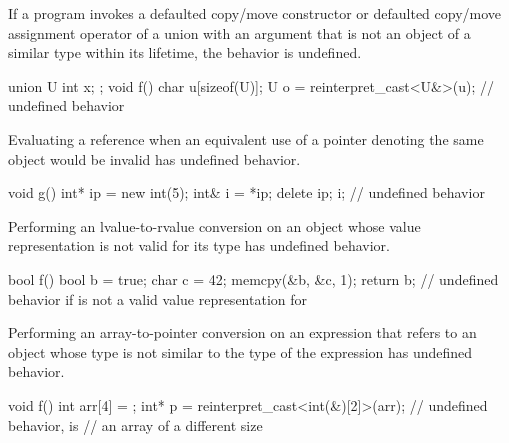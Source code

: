 \pnum
If a program invokes a defaulted copy/move constructor or
defaulted copy/move assignment operator of a union
with an argument that is not an object of a similar type
within its lifetime, the behavior is undefined.

\pnum
\begin{example}
\begin{codeblock}
union U { int x; };
void f()
{
   char u[sizeof(U)];
   U o = reinterpret_cast<U&>(u);   // undefined behavior
}
\end{codeblock}
\end{example}


\pnum
Evaluating a reference when an equivalent use of a pointer denoting the same object
would be invalid has undefined behavior.

\pnum
\begin{example}
\begin{codeblock}
void g()
{
  int* ip = new int(5);
  int& i = *ip;
  delete ip;
  i;    // undefined behavior
}
\end{codeblock}
\end{example}


\pnum
Performing an
lvalue-to-rvalue conversion
on an object whose
value representation
is not valid for its type
has undefined behavior.

\pnum
\begin{example}
\begin{codeblock}
bool f() {
  bool b = true;
  char c = 42;
  memcpy(&b, &c, 1);
  return b;         // undefined behavior if  is not a valid value representation for 
}
\end{codeblock}
\end{example}

\pnum
Performing an array-to-pointer conversion
on an expression that refers to an object
whose type is not similar to the type of the expression
has undefined behavior.

\pnum
\begin{example}
\begin{codeblock}
void f() {
  int arr[4] = {};
  int* p = reinterpret_cast<int(&)[2]>(arr);    // undefined behavior,  is
                                                // an array of a different size
}
\end{codeblock}
\end{example}

